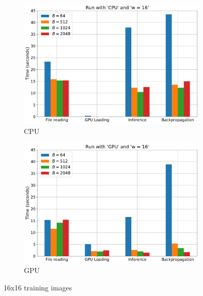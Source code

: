 \documentclass{article}
\begin{document}
{{            \begin{figure}[H]
                \centering
                \begin{subfigure}[]{0.45 \textwidth}
                    \includegraphics[width = 1.0 \textwidth]{Figures/cpu_16x16_reduced.pdf}
                    \caption{CPU}
                \end{subfigure}
                \begin{subfigure}[]{0.45 \textwidth}
                    \includegraphics[width = 1.0 \textwidth]{Figures/gpu_16x16_reduced.pdf}
                    \caption{GPU}
                \end{subfigure}
                \caption{16x16 training images}
            \end{figure}
        }

}
\end{document}
